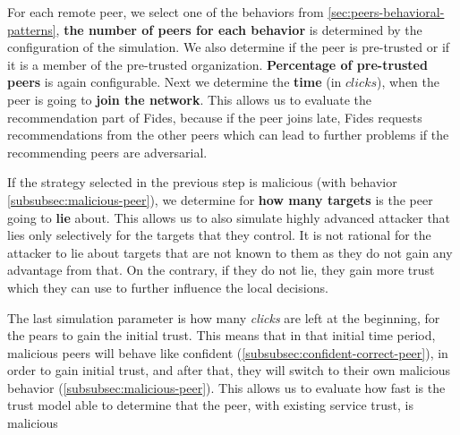 For each remote peer, we select one of the behaviors from \ref{sec:peers-behavioral-patterns}, \textbf{the number of peers for each behavior} is determined by the configuration of the simulation.
We also determine if the peer is pre-trusted or if it is a member of the pre-trusted organization. \textbf{Percentage of pre-trusted peers} is again configurable.
Next we determine the \textbf{time} (in $clicks$), when the peer is going to \textbf{join the network}. This allows us to evaluate the recommendation part of Fides, because if the peer joins late, Fides requests recommendations from the other peers which can lead to further problems if the recommending peers are adversarial.

If the strategy selected in the previous step is malicious (with behavior \ref{subsubsec:malicious-peer}), we determine for \textbf{how many targets} is the peer going to \textbf{lie} about.
This allows us to also simulate highly advanced attacker that lies only selectively for the targets that they control.
It is not rational for the attacker to lie about targets that are not known to them as they do not gain any advantage from that. On the contrary, if they do not lie, they gain more trust which they can use to further influence the local decisions. 

The last simulation parameter is how many \textit{clicks} are left at the beginning, for the pears to gain the initial trust.
This means that in that initial time period, malicious peers will behave like confident (\ref{subsubsec:confident-correct-peer}), in order to gain initial trust, and after that, they will switch to their own malicious behavior (\ref{subsubsec:malicious-peer}).
This allows us to evaluate how fast is the trust model able to determine that the peer, with existing service trust, is malicious